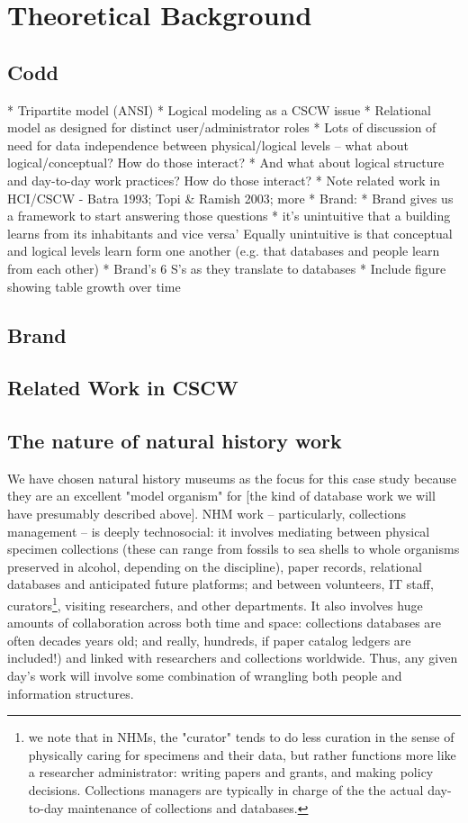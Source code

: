 \section{Theoretical Background}

\subsection{Codd}
 *	Tripartite model (ANSI)
    *	Logical modeling as a CSCW issue
    *	Relational model as designed for distinct user/administrator roles
    *	Lots of discussion of need for data independence between physical/logical levels – what about logical/conceptual? How do those interact?
	    *	And what about logical structure and day-to-day work practices? How do those interact?
    	*	Note related work in HCI/CSCW - Batra 1993; Topi & Ramish 2003; more
*	Brand: 
    *	Brand gives us a framework to start answering those questions
    *	it's unintuitive that a building learns from its inhabitants and vice versa’ Equally unintuitive is that conceptual and logical levels learn form one another (e.g. that databases and people learn from each other)
    *	Brand’s 6 S’s as they translate to databases
		*	Include figure showing table growth over time
\subsection{Brand}

\subsection{Related Work in CSCW}


\subsection{The nature of natural history work}

We have chosen natural history museums as the focus for this case study because they are an excellent "model organism" for [the kind of database work we will have presumably described above]. NHM work -- particularly, collections management -- is deeply technosocial: it involves mediating between physical specimen collections (these can range from fossils to sea shells to whole organisms preserved in alcohol, depending on the discipline), paper records, relational databases and anticipated future platforms; and between volunteers, IT staff, curators\footnote{we note that in NHMs, the "curator" tends to do less curation in the sense of physically caring for specimens and their data, but rather functions more like a researcher administrator: writing papers and grants, and making policy decisions. Collections managers are typically in charge of the the actual day-to-day maintenance of collections and databases.}, visiting researchers, and other departments. It also involves huge amounts of collaboration across both time and space: collections databases are often decades years old; and really, hundreds, if paper catalog ledgers are included!) and linked with researchers and collections worldwide. Thus, any given day’s work will involve some combination of wrangling both people and information structures.

